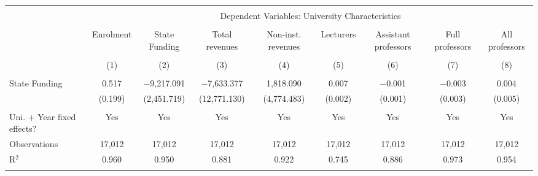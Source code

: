
\begin{tabular}{@{\extracolsep{5pt}}lcccccccc} 
\\[-1.8ex]\hline 
\hline \\[-1.8ex] 
 & \multicolumn{8}{c}{Dependent Variables: University Characteristics} \\ 
\cline{2-9} 
\\[-1.8ex] & Enrolment & State Funding & Total revenues & Non-inst. revenues & Lecturers & Assistant professors & Full professors & All professors \\ 
\\[-1.8ex] & (1) & (2) & (3) & (4) & (5) & (6) & (7) & (8)\\ 
\hline \\[-1.8ex] 
 State Funding & 0.517 & $-$9,217.091 & $-$7,633.377 & 1,818.090 & 0.007 & $-$0.001 & $-$0.003 & 0.004 \\ 
  & (0.199) & (2,451.719) & (12,771.130) & (4,774.483) & (0.002) & (0.001) & (0.003) & (0.005) \\ 
 \hline \\[-1.8ex] 
Uni. + Year fixed effects? & Yes & Yes & Yes & Yes & Yes & Yes & Yes & Yes \\ 
Observations & 17,012 & 17,012 & 17,012 & 17,012 & 17,012 & 17,012 & 17,012 & 17,012 \\ 
R$^{2}$ & 0.960 & 0.950 & 0.881 & 0.922 & 0.745 & 0.886 & 0.973 & 0.954 \\ 
\hline 
\hline \\[-1.8ex] 
\end{tabular} 
